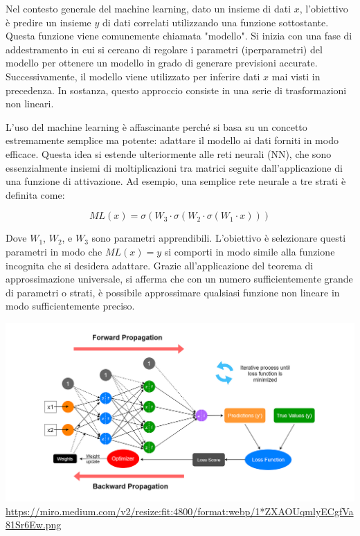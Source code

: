 Nel contesto generale del machine learning, dato un insieme di dati $x$, 
l'obiettivo è predire un insieme $y$ di dati correlati utilizzando una 
funzione sottostante. Questa funzione viene comunemente chiamata "modello". 
Si inizia con una fase di addestramento in cui si cercano di regolare i 
parametri (iperparametri) del modello per ottenere un modello in grado di 
generare previsioni accurate. Successivamente, il modello viene utilizzato 
per inferire dati $x$ mai visti in precedenza. In sostanza, questo 
approccio consiste in una serie di trasformazioni non lineari.

L'uso del machine learning è affascinante perché si basa su un concetto 
estremamente semplice ma potente: adattare il modello ai dati forniti in 
modo efficace. Questa idea si estende ulteriormente alle reti neurali (NN), 
che sono essenzialmente insiemi di moltiplicazioni tra matrici seguite 
dall'applicazione di una funzione di attivazione. Ad esempio, una 
semplice rete neurale a tre strati è definita come:

$$ML(x) = \sigma(W_3 \cdot \sigma(W_2 \cdot \sigma(W_1 \cdot x)))$$

Dove $W_1$, $W_2$, e $W_3$ sono parametri apprendibili. L'obiettivo è 
selezionare questi parametri in modo che $ML(x) = y$ si comporti in modo 
simile alla funzione incognita che si desidera adattare. Grazie 
all'applicazione del teorema di approssimazione universale, si afferma 
che con un numero sufficientemente grande di parametri o strati, è 
possibile approssimare qualsiasi funzione non lineare in modo 
sufficientemente preciso.

\begin{minipage}{\linewidth}
    \centering
    \includegraphics[width=\textwidth]{img/1_ZXAOUqmlyECgfVa81Sr6Ew.png}
    \url{https://miro.medium.com/v2/resize:fit:4800/format:webp/1*ZXAOUqmlyECgfVa81Sr6Ew.png}
    \label{fig:NN_example}
\end{minipage}

